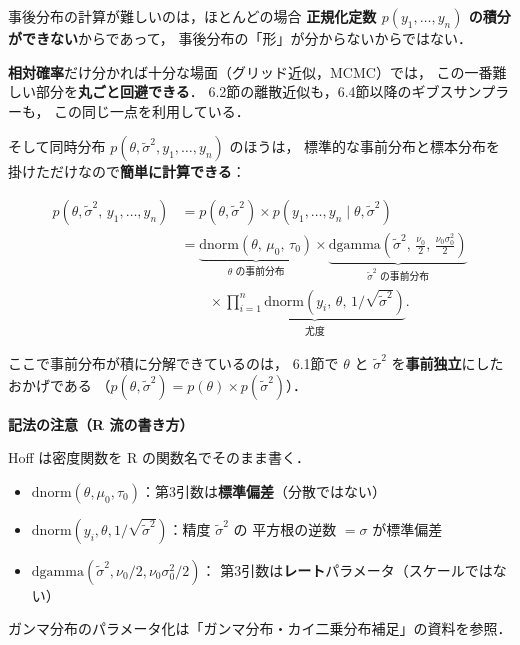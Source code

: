 \documentclass[lualatex,ja=standard,a4paper,12pt]{bxjsarticle}
\begin{document}
\begin{pointbox}
事後分布の計算が難しいのは，ほとんどの場合
\textbf{正規化定数 $p(y_1,\ldots,y_n)$ の積分ができない}からであって，
事後分布の「形」が分からないからではない．

\medskip
\textbf{相対確率}だけ分かれば十分な場面（グリッド近似，MCMC）では，
この一番難しい部分を\textbf{丸ごと回避できる}．
6.2節の離散近似も，6.4節以降のギブスサンプラーも，
この同じ一点を利用している．
\end{pointbox}

\medskip
そして同時分布 $p(\theta, \tilde{\sigma}^2, y_1, \ldots, y_n)$ のほうは，
標準的な事前分布と標本分布を掛けただけなので\textbf{簡単に計算できる}：

\begin{align*}
  p(\theta, \tilde{\sigma}^2,\, y_1, \ldots, y_n)
  &= p(\theta, \tilde{\sigma}^2) \times p(y_1, \ldots, y_n \mid \theta, \tilde{\sigma}^2) \\[4pt]
  &= \underbrace{\mathrm{dnorm}(\theta,\, \mu_0,\, \tau_0)}_{\theta \text{ の事前分布}}
   \times \underbrace{\mathrm{dgamma}\!\left(\tilde{\sigma}^2,\, \tfrac{\nu_0}{2},\, \tfrac{\nu_0\sigma_0^2}{2}\right)}_{\tilde{\sigma}^2 \text{ の事前分布}} \\[10pt]
  &\qquad \times \underbrace{\prod_{i=1}^{n} \mathrm{dnorm}\!\left(y_i,\, \theta,\, 1/\sqrt{\tilde{\sigma}^2}\right)}_{\text{尤度}}.
\end{align*}

\noindent ここで事前分布が積に分解できているのは，
6.1節で $\theta$ と $\tilde{\sigma}^2$ を\textbf{事前独立}にしたおかげである
（$p(\theta, \tilde{\sigma}^2) = p(\theta) \times p(\tilde{\sigma}^2)$）．

\begin{pointbox}
\textbf{記法の注意（R 流の書き方）}

Hoff は密度関数を R の関数名でそのまま書く．
\begin{itemize}
  \item $\mathrm{dnorm}(\theta, \mu_0, \tau_0)$：第3引数は\textbf{標準偏差}（分散ではない）
  \item $\mathrm{dnorm}(y_i, \theta, 1/\sqrt{\tilde{\sigma}^2})$：精度 $\tilde{\sigma}^2$ の
        平方根の逆数 $= \sigma$ が標準偏差
  \item $\mathrm{dgamma}(\tilde{\sigma}^2, \nu_0/2, \nu_0\sigma_0^2/2)$：
        第3引数は\textbf{レート}パラメータ（スケールではない）
\end{itemize}
ガンマ分布のパラメータ化は「ガンマ分布・カイ二乗分布補足」の資料を参照．
\end{pointbox}
\end{document}
